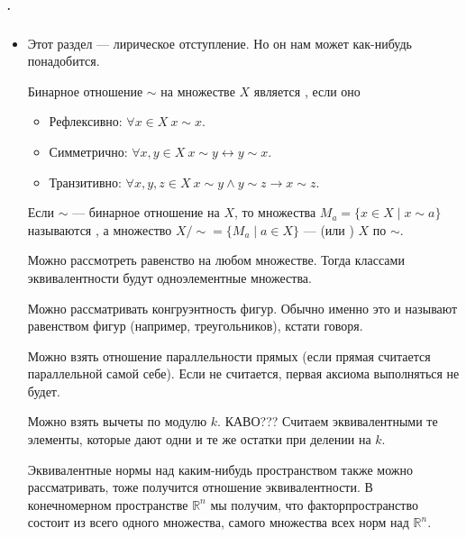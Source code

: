 \documentclass{article}
\begin{document}
    \subparagraph{.}
    \begin{itemize}
    \item[]
        \begin{Comment}
            Этот раздел --- лирическое отступление. Но он нам может как-нибудь понадобится.
        \end{Comment}
        \dfn Бинарное отношение $\sim$ на множестве $X$ является , если оно
        \begin{itemize}
            \item Рефлексивно: $\forall x\in X~x\sim x$.
            \item Симметрично: $\forall x,y\in X~x\sim y\leftrightarrow y\sim x$.
            \item Транзитивно: $\forall x,y,z\in X~x\sim y\land y\sim z\rightarrow x\sim z$.
        \end{itemize}
        \dfn Если $\sim$ --- бинарное отношение на $X$, то множества $M_a=\{x\in X\mid x\sim a\}$ называются , а множество $X/\sim=\{M_a\mid a\in X\}$ ---  (или ) $X$ по $\sim$.
        \begin{Example}
            Можно рассмотреть равенство на любом множестве. Тогда классами эквивалентности будут одноэлементные множества.
        \end{Example}
        \begin{Example}
            Можно рассматривать конгруэнтность фигур. Обычно именно это и называют равенством фигур (например, треугольников), кстати говоря.
        \end{Example}
        \begin{Example}
            Можно взять отношение параллельности прямых (если прямая считается параллельной самой себе). Если не считается, первая аксиома выполняться не будет.
        \end{Example}
        \begin{Example}
            Можно взять вычеты по модулю $k$. КАВО??? Считаем эквивалентными те элементы, которые дают одни и те же остатки при делении на $k$.
        \end{Example}
        \begin{Example}
            Эквивалентные нормы над каким-нибудь пространством также можно рассматривать, тоже получится отношение эквивалентности. В конечномерном пространстве $\mathbb R^n$ мы получим, что факторпространство состоит из всего одного множества, самого множества всех норм над $\mathbb R^n$.

\end{Example}
\end{itemize}
\end{document}
